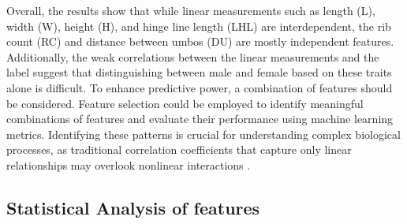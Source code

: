 Overall, the results show that while linear measurements such as length (L), width (W), height (H), and hinge line length (LHL) are interdependent, the rib count (RC) and distance between umbos (DU) are mostly independent features. Additionally, the weak correlations between the linear measurements and the label suggest that distinguishing between male and female \Tgranosa based on these traits alone is difficult. To enhance predictive power, a combination of features should be considered. Feature selection could be employed to identify meaningful combinations of features and evaluate their performance using machine learning metrics. Identifying these patterns is crucial for understanding complex biological processes, as traditional correlation coefficients that capture only linear relationships may overlook nonlinear interactions \cite{pividori2024}.


\subsection{Statistical Analysis of \Tgranosa features}

\begin{table}[H]
	\centering
	{\fontsize{8}{10}\selectfont 
	}
	\caption{ Dataset Overview and Exploration}
	\label{tab:descriptive-stat}
\end{table}

